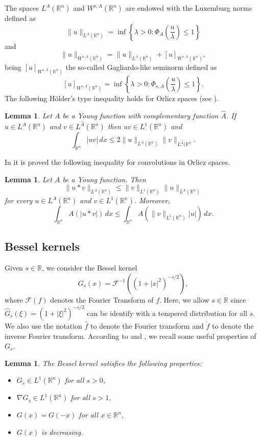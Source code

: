 \documentclass[leqno,twoside, 12pt]{amsart}
\theoremstyle{plain}
\numberwithin{equation}{section} \numberwithin{figure}{section}
\newtheorem{lemma}[theorem]{Lemma}
\theoremstyle{definition}
\newcommand{\R}{\mathbb R}
\numberwithin{equation}{section}
\begin{document}
The spaces $L^A(\R^n)$ and $W^{s,A}(\R^n)$ are endowed with the Luxemburg norms defined as
$$
\|u\|_{L^A(\R^n)} = \inf\left\{\lambda>0 \colon \Phi_A\left(\frac{u}{\lambda} \right)\leq 1 \right\}
$$
and
$$
\|u\|_{W^{s,A}(\R^n)} = \|u\|_{L^A(\R^n)} + [u]_{W^{s,A}(\R^n)},
$$
being $[u]_{W^{s,A}(\R^n)}$ the so-called Gagliardo-like seminorm defined as
$$
[u]_{W^{s,A}(\R^n)} = \inf\left\{ \lambda >0  \colon \Phi_{s,A}\left(\frac{u}{\lambda} \right)\leq 1\right\}.
$$ 
 The following H\"older's type inequality holds for Orlicz spaces (see \cite[Theorem 3.7.5]{kufner}).
\begin{lemma}
Let $A$ be a Young function with complementary function $\hat A$. If $u\in L^A(\R^n)$ and $v\in L^{\hat A}(\R^n)$ then $uv\in L^1(\R^n)$ and
$$
\int_{\R^n} |uv|\,dx \leq 2 \|u\|_{L^A(\R^n)} \|v\|_{L^{\hat A}(\R^n}.
$$
\end{lemma} 

\noindent In \cite[Theorem 4.1]{BC} it is proved the following inequality for convolutions in Orlicz spaces.
 \begin{lemma} \label{lema.1}
 Let $A$ be a Young function. Then
 $$
 \|u*v\|_{L^A(\R^n)} \leq \|v\|_{L^1(\R^n)}\|u\|_{L^A(\R^n)}
 $$
 for every $u\in L^A(\R^n)$ and $v\in L^1(\R^n)$. Moreover,
 $$
 \int_{\R^n}A(|u*v|)\,dx \leq\int_{\R^n} A\left(\|v\|_{L^1(\R^n)} |u|\right)\,dx.
 $$
 \end{lemma}



\subsection{Bessel kernels} \label{sec.potential.spaces}

Given $s\in \R$, we consider the Bessel kernel
$$
G_s(x)=\mathcal{F}^{-1}\left((1+|x|^2)^{-s/2}\right),
$$
where $\mathcal{F}(f)$ denotes the Fourier Transform of $f$.  Here, we allow $s\in \R$ since $\hat G_s(\xi)=(1+|\xi|^2)^{-s/2}$ can be identify with a tempered distribution for all $s$.  We also use the notation $\hat f$ to denote the Fourier transform and $\check f$ to denote the inverse Fourier transform.  According to \cite[Proposition 2]{S} and \cite[pages 13 and 27]{AS}, we recall some useful properties of $G_s$.
\begin{lemma} \label{lema.G}
The Bessel kernel satisfies the following properties:
\begin{itemize}
\item[i)] $G_s\in L^1(\mathbb{R}^n)$ for all $s>0$,
\item[ii)] $\nabla G_s\in L^1(\mathbb{R}^n)$ for all $s>1$,
\item[iii)] $G(x) = G(-x)$ for all $x\in \R^n$,
\item[iv)] $G(x)$ is decreasing.
\end{itemize}
\end{lemma}
\end{document}
